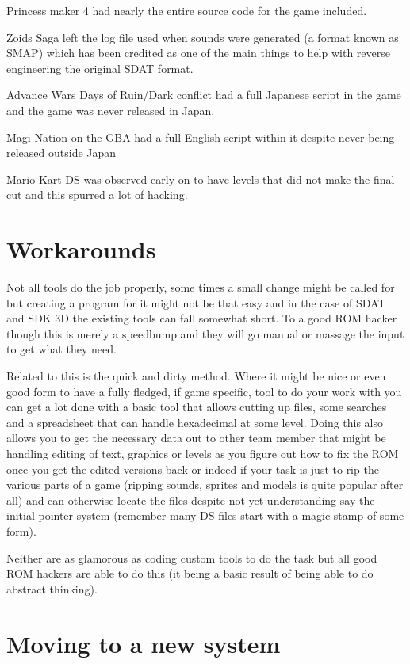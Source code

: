 \documentclass[
]{book}
\begin{document}
Princess maker 4 had nearly the entire source code for the game included.

Zoids Saga left the log file used when sounds were generated (a format known as SMAP) which has been credited as one of the main things to help with reverse engineering the original SDAT format.

Advance Wars Days of Ruin/Dark conflict had a full Japanese script in the game and the game was never released in Japan.

Magi Nation on the GBA had a full English script within it despite never being released outside Japan

Mario Kart DS was observed early on to have levels that did not make the final cut and this spurred a lot of hacking.

\hypertarget{workarounds}{%
\chapter{Workarounds}\label{workarounds}}

Not all tools do the job properly, some times a small change might be called for but creating a program for it might not be that easy and in the case of SDAT and SDK 3D the existing tools can fall somewhat short. To a good ROM hacker though this is merely a speedbump and they will go manual or massage the input to get what they need.

Related to this is the quick and dirty method. Where it might be nice or even good form to have a fully fledged, if game specific, tool to do your work with you can get a lot done with a basic tool that allows cutting up files, some searches and a spreadsheet that can handle hexadecimal at some level. Doing this also allows you to get the necessary data out to other team member that might be handling editing of text, graphics or levels as you figure out how to fix the ROM once you get the edited versions back or indeed if your task is just to rip the various parts of a game (ripping sounds, sprites and models is quite popular after all) and can otherwise locate the files despite not yet understanding say the initial pointer system (remember many DS files start with a magic stamp of some form).

Neither are as glamorous as coding custom tools to do the task but all good ROM hackers are able to do this (it being a basic result of being able to do abstract thinking).

\hypertarget{moving-to-a-new-system}{%
\chapter{Moving to a new system}\label{moving-to-a-new-system}}
\end{document}
